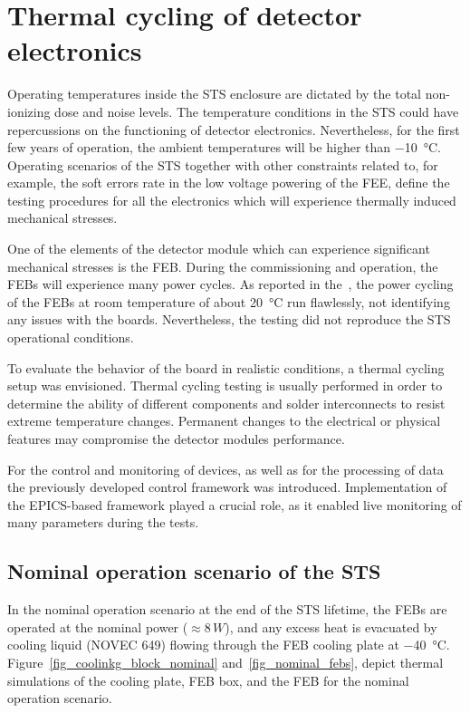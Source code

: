 \newpage
\section{Thermal cycling of detector electronics}
\label{thermal_cycling}
Operating temperatures inside the \gls{STS} enclosure are dictated by the total non-ionizing dose and noise levels. The temperature conditions in the STS could have repercussions on the functioning of detector electronics. Nevertheless, for the first few years of operation, the ambient temperatures will be higher than \SI{-10}{\celsius}. Operating scenarios of the \gls{STS} together with other constraints related to, for example, the soft errors rate in the low voltage powering of the \gls{FEE}, define the testing procedures for all the electronics which will experience thermally induced mechanical stresses.

One of the elements of the detector module which can experience significant mechanical stresses is the \gls{FEB}.
During the commissioning and operation, the \glspl{FEB} will experience many power cycles. As reported in the~\cite{CBM_PR_2021}, the power cycling of the \glspl{FEB} at room temperature of about \SI{20}{\celsius} run flawlessly, not identifying any issues with the boards. Nevertheless, the testing did not reproduce the STS operational conditions.

To evaluate the behavior of the board in realistic conditions, a thermal cycling setup was envisioned. Thermal cycling testing is usually performed in order to determine the ability of different components and solder interconnects to resist extreme temperature changes. Permanent changes to the electrical or physical features may compromise the detector modules performance.

 For the control and monitoring of devices, as well as for the processing of data the previously developed control framework was introduced. Implementation of the EPICS-based framework played a crucial role, as it enabled live monitoring of many parameters during the tests.

\subsection{Nominal operation scenario of the STS}
\label{nominal}

In the nominal operation scenario at the end of the STS lifetime, the \glspl{FEB} are operated at the nominal power ($\approx8\,W$), and any excess heat is evacuated by cooling liquid (NOVEC 649) flowing through the \gls{FEB} cooling plate at \SI{-40}{\celsius}. Figure~\ref{fig_coolinkg_block_nominal} and~\ref{fig_nominal_febs}, depict thermal simulations of the cooling plate, \gls{FEB} box, and the \gls{FEB} for the nominal operation scenario.

